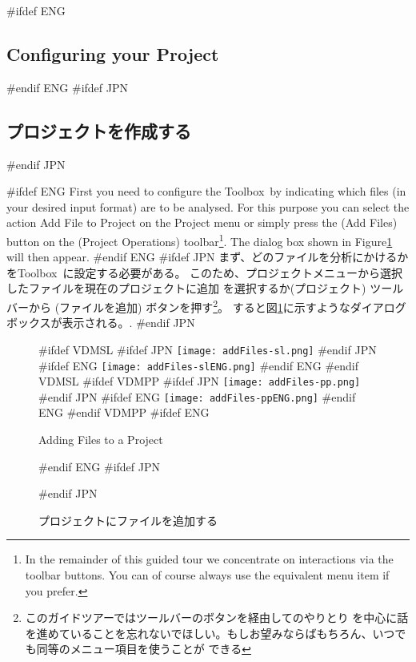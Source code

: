 \documentclass[\pformat,12pt]{article}
\newcommand{\Toolbox}{Toolbox}
\newcommand{\Toolbox}{Toolbox}
\newcommand{\guicmd}[1]{{\sf #1}}
\newcommand{\guicmd}[1]{{\gt #1}}
\begin{document}
#ifdef ENG
\subsection{Configuring your Project}
#endif ENG
#ifdef JPN
\subsection{プロジェクトを作成する}
#endif JPN

#ifdef ENG
First you need to configure the \Toolbox\ by indicating which 
files (in your desired input format) are to be analysed. For this
purpose you can select the action \guicmd{Add File to Project} on the
\guicmd{Project} menu or simply press the 
(\guicmd{Add Files}) button on the (\guicmd{Project Operations})
toolbar\footnote{In the remainder of this guided tour we concentrate
  on interactions via the toolbar buttons. You can of course always
  use the equivalent menu item if you prefer.}. The dialog box shown
in Figure\ref{fig:addFiles} will then appear.
#endif ENG
#ifdef JPN
まず、どのファイルを分析にかけるかを\Toolbox\ に設定する必要がある。
このため、プロジェクトメニューから\guicmd{選択したファイルを現在のプロジェクトに追加} を選択するか(\guicmd{プロジェクト})
ツールバーから  
(\guicmd{ファイルを追加}) ボタンを押す\footnote{このガイドツアーではツールバーのボタンを経由してのやりとり
を中心に話を進めていることを忘れないでほしい。もしお望みならばもちろん、いつでも同等のメニュー項目を使うことが
できる}。
すると図\ref{fig:addFiles}に示すようなダイアログボックスが表示される。.
#endif JPN

\begin{figure}[tbh]
\begin{center}
#ifdef VDMSL
#ifdef JPN
\texttt{[image: addFiles-sl.png]}
#endif JPN
#ifdef ENG
\texttt{[image: addFiles-slENG.png]}
#endif ENG
#endif VDMSL
#ifdef VDMPP
#ifdef JPN
\texttt{[image: addFiles-pp.png]}
#endif JPN
#ifdef ENG
\texttt{[image: addFiles-ppENG.png]}
#endif ENG
#endif VDMPP
#ifdef ENG
\caption{Adding Files to a Project}
#endif ENG
#ifdef JPN
\caption{プロジェクトにファイルを追加する}
#endif JPN
\label{fig:addFiles}
\end{center}
\end{figure}
\end{document}
